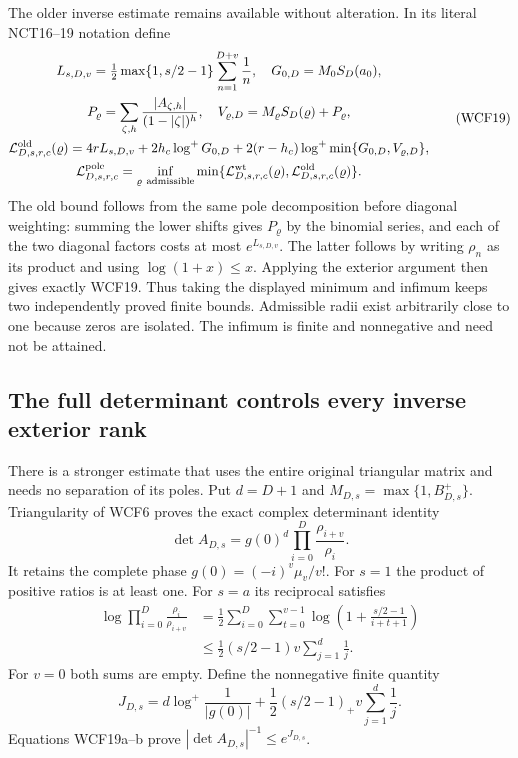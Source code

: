 \documentclass[11pt,a4paper]{article}
\begin{document}
The older inverse estimate remains available without alteration. In its
literal NCT16--19 notation define
\[
\begin{gathered}
 L_{s,D,v}=\tfrac12\max\{1,s/2-1\}\sum_{n=1}^{D+v}\frac1n,
 \quad G_{0,D}=M_0S_D(a_0),\\
 P_\varrho=\sum_{\zeta,h}\frac{|A_{\zeta,h}|}{(1-|\zeta|)^h},
 \quad V_{\varrho,D}=M_\varrho S_D(\varrho)+P_\varrho,\\
 \mathcal L^{\rm old}_{D,s,r,c}(\varrho)
 =4rL_{s,D,v}+2h_c\log^+G_{0,D}
       +2(r-h_c)\log^+\min\{G_{0,D},V_{\varrho,D}\},\\
 \mathcal L^{\rm pole}_{D,s,r,c}=
  \inf_{\varrho\ {\rm admissible}}
  \min\{\mathcal L^{\rm wt}_{D,s,r,c}(\varrho),
        \mathcal L^{\rm old}_{D,s,r,c}(\varrho)\}.
\end{gathered}\tag{WCF19}
\]
The old bound follows from the same pole decomposition before diagonal
weighting: summing the lower shifts gives $P_\varrho$ by the binomial
series, and each of the two diagonal factors costs at most
$e^{L_{s,D,v}}$. The latter follows by writing $\rho_n$ as its
product and using $\log(1+x)\le x$. Applying the exterior argument
then gives exactly WCF19. Thus taking the displayed minimum and
infimum keeps two independently proved finite bounds. Admissible radii
exist arbitrarily close to one because zeros are isolated. The infimum
is finite and nonnegative and need not be attained.

\subsection{The full determinant controls every inverse exterior rank}

There is a stronger estimate that uses the entire original triangular
matrix and needs no separation of its poles. Put $d=D+1$ and
$M_{D,s}=\max\{1,B^+_{D,s}\}$. Triangularity of WCF6 proves the
exact complex determinant identity
\[
 \det A_{D,s}=g(0)^d\prod_{i=0}^{D}\frac{\rho_{i+v}}{\rho_i}.
 \tag{WCF19a}
\]
It retains the complete phase $g(0)=(-i)^v\mu_v/v!$. For $s=1$ the
product of positive ratios is at least one. For $s=a$ its reciprocal
satisfies
\[
 \begin{split}
 \log\prod_{i=0}^{D}\frac{\rho_i}{\rho_{i+v}}
 &=\frac12\sum_{i=0}^{D}\sum_{t=0}^{v-1}
           \log\left(1+\frac{s/2-1}{i+t+1}\right)\\
 &\le\frac12(s/2-1)v\sum_{j=1}^{d}\frac1j.
 \end{split}\tag{WCF19b}
\]
For $v=0$ both sums are empty. Define the nonnegative finite quantity
\[
 J_{D,s}=d\log^+\frac1{|g(0)|}
       +\frac12(s/2-1)_+v\sum_{j=1}^{d}\frac1j.
 \tag{WCF19c}
\]
Equations WCF19a--b prove $|\det A_{D,s}|^{-1}\le e^{J_{D,s}}$.
\end{document}
